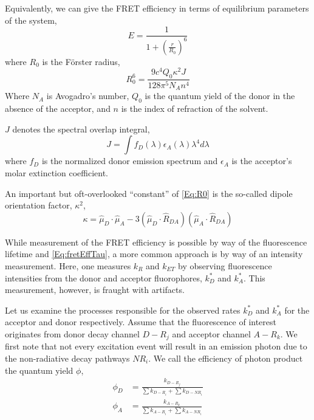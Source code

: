 \documentclass{article}
\begin{document}
Equivalently, we can give the FRET efficiency in terms of equilibrium
parameters of the system,
\begin{equation}
  E = \frac{1}{1 + \left( \frac{r}{R_0} \right)^6}
  \label{Eq:fretEff}
\end{equation}
where $R_0$ is the F\"orster radius,
\begin{equation}
  R_0^6 = \frac{9 c^4 Q_0 \kappa^2 J}{128 \pi^5 N_A n^4}
  \label{Eq:R0}
\end{equation}
Where $N_A$ is Avogadro's number, $Q_0$ is the quantum yield of the
donor in the absence of the acceptor, and $n$ is the index of
refraction of the solvent.

$J$ denotes the spectral overlap integral,
\[ J = \int f_D(\lambda) \epsilon_A(\lambda) \lambda^4 d\lambda \]
where $f_D$ is the normalized donor emission spectrum and $\epsilon_A$
is the acceptor's molar extinction coefficient.

An important but oft-overlooked ``constant'' of \eqref{Eq:R0} is
the so-called dipole orientation factor, $\kappa^2$,
\begin{equation}
  \kappa = \hat\mu_D \cdot \hat\mu_A - 3(\hat\mu_D \cdot \hat R_{DA}) (\hat\mu_A \cdot \hat R_{DA})
  \label{Eq:kappa}
\end{equation}

While measurement of the FRET efficiency is possible by way of the
fluorescence lifetime and \eqref{Eq:fretEffTau}, a more common
approach is by way of an intensity measurement. Here, one 
measures $k_{R}$ and $k_{ET}$ by observing fluorescence intensities
from the donor and acceptor fluorophores, $k^*_D$ and $k^*_A$. This
measurement, however, is fraught with artifacts.

Let us examine the processes responsible for the observed rates
$k^*_D$ and $k^*_A$ for the acceptor and donor respectively. Assume
that the fluorescence of interest originates from donor decay channel
$D-R_j$ and acceptor channel $A-R_k$. We first note that not every
excitation event will result in an emission photon due to the
non-radiative decay pathways $NR_i$. We call the efficiency of photon
product the quantum yield $\phi$,
\begin{align*}
  \phi_D & = \frac{k_{D-R_j}}{\sum k_{D-R_i} + \sum k_{D-NR_i}} \\
  \phi_A & = \frac{k_{A-R_k}}{\sum k_{A-R_i} + \sum k_{A-NR_i}} \\
\end{align*}
\end{document}
